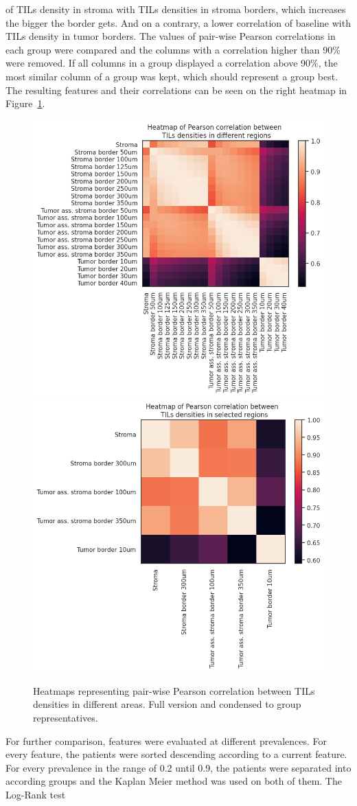 of TILs density in stroma with TILs densities in stroma borders, which increases the bigger
the border gets. And on a contrary, a lower correlation of baseline with TILs density in tumor borders.
The values of pair-wise Pearson correlations in each group were compared and the columns with
a correlation higher than 90\% were removed. If all columns in a group displayed a
correlation above 90\%, the most similar column of a group was kept, which should
represent a group best. The resulting features and their correlations can be seen on the right heatmap
in Figure~\ref{fig:heatmaps_tils}.
\begin{figure}[h!]
\includegraphics[width=.5\linewidth]{figures/survival/heatmap_tils.png}
\includegraphics[width=.5\linewidth]{figures/survival/heatmap_tils_min.png}
\caption{Heatmaps representing pair-wise Pearson correlation between TILs densities in different areas.
Full version and condensed to group representatives.}
\label{fig:heatmaps_tils}
\end{figure}
For further comparison, features were evaluated at different prevalences.
For every feature, the patients were sorted descending according to a current feature.
For every prevalence in the range of 0.2 until 0.9, the patients were separated into
according groups and the Kaplan Meier method was used on both of them. The Log-Rank test
